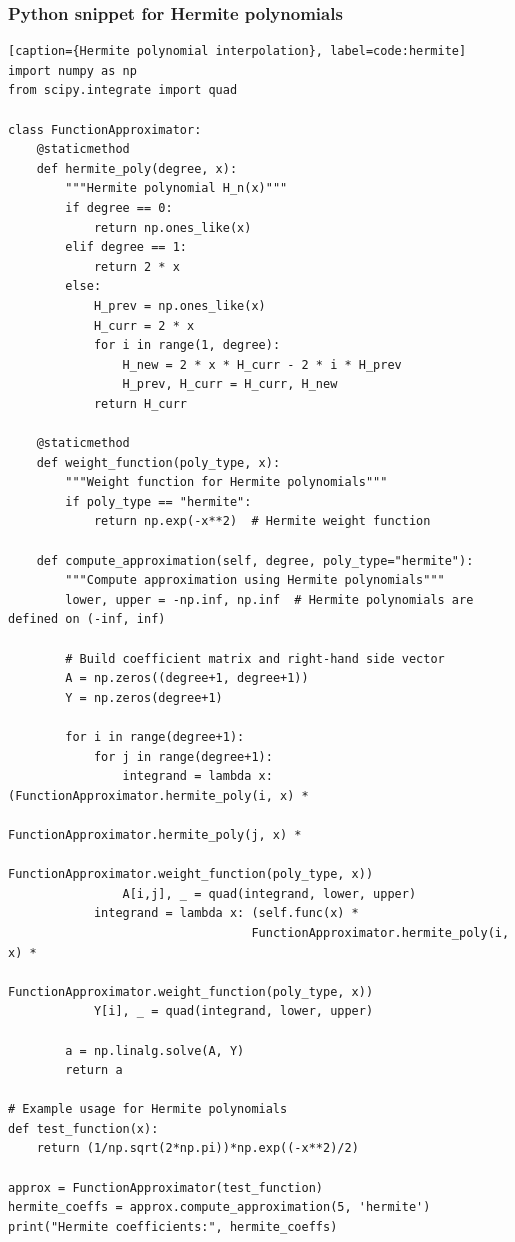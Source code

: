 \documentclass[10pt]{article}
\begin{document}
\subsubsection{Python snippet for Hermite polynomials}
\begin{lstlisting}[style=custompython][caption={Hermite polynomial interpolation}, label=code:hermite]
import numpy as np
from scipy.integrate import quad

class FunctionApproximator:
    @staticmethod
    def hermite_poly(degree, x):
        """Hermite polynomial H_n(x)"""
        if degree == 0:
            return np.ones_like(x)
        elif degree == 1:
            return 2 * x
        else:
            H_prev = np.ones_like(x)
            H_curr = 2 * x
            for i in range(1, degree):
                H_new = 2 * x * H_curr - 2 * i * H_prev
                H_prev, H_curr = H_curr, H_new
            return H_curr

    @staticmethod
    def weight_function(poly_type, x):
        """Weight function for Hermite polynomials"""
        if poly_type == "hermite":
            return np.exp(-x**2)  # Hermite weight function

    def compute_approximation(self, degree, poly_type="hermite"):
        """Compute approximation using Hermite polynomials"""
        lower, upper = -np.inf, np.inf  # Hermite polynomials are defined on (-inf, inf)
        
        # Build coefficient matrix and right-hand side vector
        A = np.zeros((degree+1, degree+1))
        Y = np.zeros(degree+1)

        for i in range(degree+1):
            for j in range(degree+1):
                integrand = lambda x: (FunctionApproximator.hermite_poly(i, x) *
                                      FunctionApproximator.hermite_poly(j, x) *
                                      FunctionApproximator.weight_function(poly_type, x))
                A[i,j], _ = quad(integrand, lower, upper)
            integrand = lambda x: (self.func(x) *
                                  FunctionApproximator.hermite_poly(i, x) *
                                  FunctionApproximator.weight_function(poly_type, x))
            Y[i], _ = quad(integrand, lower, upper)

        a = np.linalg.solve(A, Y)
        return a

# Example usage for Hermite polynomials
def test_function(x):
    return (1/np.sqrt(2*np.pi))*np.exp((-x**2)/2)

approx = FunctionApproximator(test_function)
hermite_coeffs = approx.compute_approximation(5, 'hermite')
print("Hermite coefficients:", hermite_coeffs)
\end{lstlisting}
\end{document}

